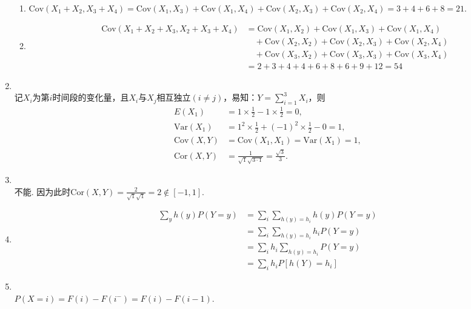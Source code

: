 \begin{enumerate}[label=\arabic{section}.\arabic*]
    \begin{enumerate}[label=\alph*)]
        \item $\mathrm{Cov}(X_1+X_2,X_3+X_4)=\mathrm{Cov}(X_1,X_3)+\mathrm{Cov}(X_1,X_4)+\mathrm{Cov}(X_2,X_3)+\mathrm{Cov}(X_2,X_4)=3+4+6+8=21$.
        \item
        \begin{align*}
            \mathrm{Cov}(X_1+X_2+X_3,X_2+X_3+X_4)&=\mathrm{Cov}(X_1,X_2)+\mathrm{Cov}(X_1,X_3)+\mathrm{Cov}(X_1,X_4)\\
            &\quad+\mathrm{Cov}(X_2,X_2)+\mathrm{Cov}(X_2,X_3)+\mathrm{Cov}(X_2,X_4)\\
            &\quad+\mathrm{Cov}(X_3,X_2)+\mathrm{Cov}(X_3,X_3)+\mathrm{Cov}(X_3,X_4)\\
            &=2+3+4+4+6+8+6+9+12=54
        \end{align*}
    \end{enumerate}
    \item \sol\\
    记$X_i$为第$i$时间段的变化量，且$X_i$与$X_j$相互独立$(i \neq j)$，易知：$\displaystyle Y=\sum_{i=1}^3 X_i$，则
    \begin{align*}
        E(X_1)&=1\times\frac{1}{2}-1\times\frac{1}{2}=0,\\
        \mathrm{Var}(X_1)&=1^2\times\frac{1}{2}+(-1)^2\times\frac{1}{2}-0=1,\\
        \mathrm{Cov}(X,Y)&=\mathrm{Cov}(X_1,X_1)=\mathrm{Var}(X_1)=1,\\
        \mathrm{Cor}(X,Y)&=\frac{1}{\sqrt{1}\sqrt{3\cdot1}}=\frac{\sqrt{3}}{3}.
    \end{align*}
    \item \sol\\
    不能. 因为此时$\displaystyle \mathrm{Cor}(X,Y)=\frac{2}{\sqrt{1}\sqrt{1}}=2 \notin [-1,1]$.
    \item \pro
    \begin{align*}
        \sum_y h(y)P(Y=y) & = \sum_i \sum_{h(y)=h_i} h(y) P(Y=y)\\
        & = \sum_i \sum_{h(y)=h_i} h_i P(Y=y)\\
        & = \sum_i h_i \sum_{h(y)=h_i} P(Y=y)\\
        & = \sum_i h_i P[h(Y)=h_i]
    \end{align*}
    \item \sol\\
    $P(X=i)= F(i)-F(i^-)=F(i)-F(i-1)$.
\end{enumerate}
\clearpage